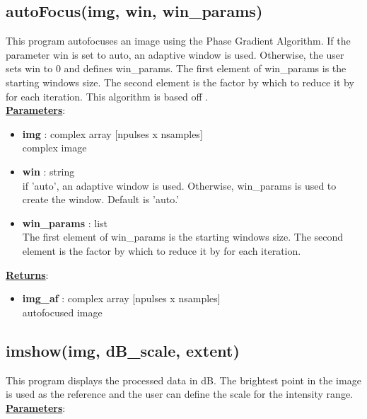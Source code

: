\documentclass{article}
\newcommand{\defs}[2]{\textbf{{#1}} : {#2}}
\begin{document}
\subsection{autoFocus(img, win, win\_params)}
This program autofocuses an image using the Phase Gradient Algorithm.  If the parameter win is set to auto, an adaptive window is used.  Otherwise, the user sets win to 0 and defines win\_params.  The first element of win\_params is the starting windows size.  The second element is the factor by which to reduce it by for each iteration.  This algorithm is based off \cite{303752}.\\

\noindent \underline{\textbf{Parameters}}:

\begin{itemize}
	\item \defs{img}{complex array [npulses x nsamples]}\\
  		complex image
  	\item \defs{win}{string}\\
  		if 'auto', an adaptive window is used.  Otherwise, win\_params is used to create the window.  Default is 'auto.'
  	\item \defs{win\_params}{list}\\
  	  		The first element of win\_params is the starting windows size.  The second element is the factor by which to reduce it by for each iteration.
  	
\end{itemize}

\noindent \underline{\textbf{Returns}}:
\begin{itemize}
	\item \defs{img\_af}{complex array [npulses x nsamples]}\\
	autofocused image
\end{itemize}

\subsection{imshow(img, dB\_scale, extent)}
This program displays the processed data in dB.  The brightest point in the image is used as the reference and the user can define the scale for the intensity range. \\

\noindent \underline{\textbf{Parameters}}:
\end{document}
